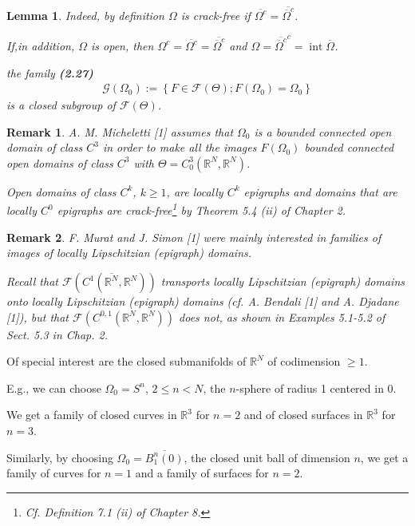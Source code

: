 \documentclass{book}
\numberwithin{equation}{section}
\newtheorem{lemma}{Lemma}[section]
\newtheorem{remark}{Remark}[section]
\begin{document}
\begin{enumerate}
\begin{lemma}
{            Indeed, by definition $\Omega$ is crack-free if $\overline{\Omega^c} = \overline{\overline{\Omega}^c}$.
            
            If,in addition, $\Omega$ is open, then $\Omega^c = \overline{\Omega^c} = \overline{\overline{\Omega}^c}$ and $\Omega = \overline{\overline{\Omega}^c}^c = \operatorname{int}\overline{\Omega}$.} the family \textbf{(2.27)}
        \begin{align*}
            \mathcal{G}\left(\Omega_0\right) := \left\{F\in\mathcal{F}(\Theta);F\left(\Omega_0\right) = \Omega_0\right\}
        \end{align*}
        is a closed subgroup of $\mathcal{F}(\Theta)$.
    \end{lemma}

    \begin{remark}
        A. M. Micheletti [1] assumes that $\Omega_0$ is a bounded connected open domain of class $C^3$ in order to make all the images $F(\Omega_0)$ bounded connected open domains of class $C^3$ with $\Theta = C_0^3(\mathbb{R}^N,\mathbb{R}^N)$.
        
        Open domains of class $C^k$, $k\ge 1$, are locally $C^k$ epigraphs and domains that are locally $C^0$ epigraphs are crack-free\footnote{Cf. Definition 7.1 (ii) of Chapter 8.} by Theorem 5.4 (ii) of Chapter 2.
    \end{remark}
    
    \begin{remark}
        F. Murat and J. Simon [1] were mainly interested in families of images of locally Lipschitzian (epigraph) domains.
        
        Recall that $\mathcal{F}(C^1(\overline{\mathbb{R}^N},\mathbb{R}^N))$ transports locally Lipschitzian (epigraph) domains onto locally Lipschitzian (epigraph) domains (cf. A. Bendali [1] and A. Djadane [1]), but that $\mathcal{F}(C^{0,1}(\mathbb{R}^N,\mathbb{R}^N))$ does not, as shown in Examples 5.1-5.2 of Sect. 5.3 in Chap. 2.
    \end{remark}
    Of special interest are the closed submanifolds of $\mathbb{R}^N$ of codimension $\ge 1$.
    
    E.g., we can choose $\Omega_0 = S^n$, $2\le n < N$, the $n$-sphere of radius 1 centered in 0.
    
    We get a family of closed curves in $\mathbb{R}^3$ for $n = 2$ and of closed surfaces in $\mathbb{R}^3$ for $n = 3$.
    
    Similarly, by choosing $\Omega_0 = \overline{B_1^n(0)}$, the closed unit ball of dimension $n$, we get a family of curves for $n = 1$ and a family of surfaces for $n = 2$.
    

\end{enumerate}
\end{document}
